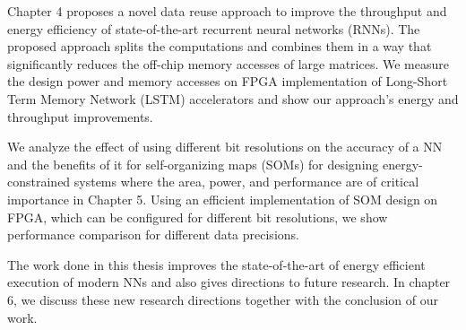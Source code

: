 Chapter 4 proposes a novel data reuse approach to improve the throughput and energy efficiency of state-of-the-art recurrent neural networks (RNNs). The proposed approach splits the computations and combines them in a way that significantly reduces the off-chip memory accesses of large matrices. We measure the design power and memory accesses on FPGA implementation of Long-Short Term Memory Network (LSTM) accelerators and show our approach's energy and throughput improvements.

We analyze the effect of using different bit resolutions on the accuracy of a NN and the benefits of it for self-organizing maps (SOMs) for designing energy-constrained systems where the area, power, and performance are of critical importance in Chapter 5. Using an efficient implementation of SOM design on FPGA, which can be configured for different bit resolutions, we show performance comparison for different data precisions. 

The work done in this thesis improves the state-of-the-art of energy efficient execution of modern NNs and also gives directions to future research. In chapter 6, we discuss these new research directions together with the conclusion of our work.